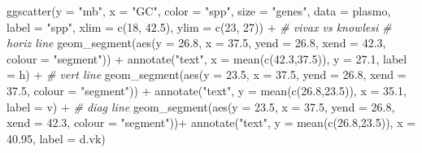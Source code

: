 \documentclass[
]{book}
\newenvironment{Shaded}{\begin{snugshade}}{\end{snugshade}}
\newcommand{\AttributeTok}[1]{\textcolor[rgb]{0.77,0.63,0.00}{#1}}
\newcommand{\CommentTok}[1]{\textcolor[rgb]{0.56,0.35,0.01}{\textit{#1}}}
\newcommand{\DecValTok}[1]{\textcolor[rgb]{0.00,0.00,0.81}{#1}}
\newcommand{\FloatTok}[1]{\textcolor[rgb]{0.00,0.00,0.81}{#1}}
\newcommand{\FunctionTok}[1]{\textcolor[rgb]{0.00,0.00,0.00}{#1}}
\newcommand{\NormalTok}[1]{#1}
\newcommand{\SpecialCharTok}[1]{\textcolor[rgb]{0.00,0.00,0.00}{#1}}
\newcommand{\StringTok}[1]{\textcolor[rgb]{0.31,0.60,0.02}{#1}}
\begin{document}
\begin{Shaded}
\begin{Highlighting}[]
\FunctionTok{ggscatter}\NormalTok{(}\AttributeTok{y =} \StringTok{"mb"}\NormalTok{,}
          \AttributeTok{x =} \StringTok{"GC"}\NormalTok{,}
          \AttributeTok{color =} \StringTok{"spp"}\NormalTok{,}
          \AttributeTok{size =} \StringTok{"genes"}\NormalTok{,}
          \AttributeTok{data =}\NormalTok{ plasmo,}
          \AttributeTok{label =} \StringTok{"spp"}\NormalTok{,}
          \AttributeTok{xlim =} \FunctionTok{c}\NormalTok{(}\DecValTok{18}\NormalTok{, }\FloatTok{42.5}\NormalTok{),}
          \AttributeTok{ylim =} \FunctionTok{c}\NormalTok{(}\DecValTok{23}\NormalTok{, }\DecValTok{27}\NormalTok{)) }\SpecialCharTok{+}
    \CommentTok{\# vivax vs knowlesi}
   \CommentTok{\# horiz line}
   \FunctionTok{geom\_segment}\NormalTok{(}\FunctionTok{aes}\NormalTok{(}\AttributeTok{y    =} \FloatTok{26.8}\NormalTok{,    }\AttributeTok{x =} \FloatTok{37.5}\NormalTok{,}
                   \AttributeTok{yend =} \FloatTok{26.8}\NormalTok{, }\AttributeTok{xend =} \FloatTok{42.3}\NormalTok{,}
                   \AttributeTok{colour =} \StringTok{"segment"}\NormalTok{)) }\SpecialCharTok{+}
  \FunctionTok{annotate}\NormalTok{(}\StringTok{"text"}\NormalTok{,}
           \AttributeTok{x =} \FunctionTok{mean}\NormalTok{(}\FunctionTok{c}\NormalTok{(}\FloatTok{42.3}\NormalTok{,}\FloatTok{37.5}\NormalTok{)), }
           \AttributeTok{y =} \FloatTok{27.1}\NormalTok{,}
           \AttributeTok{label =}\NormalTok{ h) }\SpecialCharTok{+}
  \CommentTok{\# vert line}
   \FunctionTok{geom\_segment}\NormalTok{(}\FunctionTok{aes}\NormalTok{(}\AttributeTok{y    =} \FloatTok{23.5}\NormalTok{,    }\AttributeTok{x =} \FloatTok{37.5}\NormalTok{,}
                   \AttributeTok{yend =} \FloatTok{26.8}\NormalTok{, }\AttributeTok{xend =} \FloatTok{37.5}\NormalTok{,}
                   \AttributeTok{colour =} \StringTok{"segment"}\NormalTok{)) }\SpecialCharTok{+}
    \FunctionTok{annotate}\NormalTok{(}\StringTok{"text"}\NormalTok{,}
           \AttributeTok{y =} \FunctionTok{mean}\NormalTok{(}\FunctionTok{c}\NormalTok{(}\FloatTok{26.8}\NormalTok{,}\FloatTok{23.5}\NormalTok{)), }
           \AttributeTok{x =} \FloatTok{35.1}\NormalTok{,}
           \AttributeTok{label =}\NormalTok{ v) }\SpecialCharTok{+}
    \CommentTok{\# diag line}
  \FunctionTok{geom\_segment}\NormalTok{(}\FunctionTok{aes}\NormalTok{(}\AttributeTok{y    =} \FloatTok{23.5}\NormalTok{,    }\AttributeTok{x =} \FloatTok{37.5}\NormalTok{, }
                   \AttributeTok{yend =} \FloatTok{26.8}\NormalTok{, }\AttributeTok{xend =} \FloatTok{42.3}\NormalTok{, }
                   \AttributeTok{colour =} \StringTok{"segment"}\NormalTok{))}\SpecialCharTok{+}
    \FunctionTok{annotate}\NormalTok{(}\StringTok{"text"}\NormalTok{,}
           \AttributeTok{y =} \FunctionTok{mean}\NormalTok{(}\FunctionTok{c}\NormalTok{(}\FloatTok{26.8}\NormalTok{,}\FloatTok{23.5}\NormalTok{)), }
           \AttributeTok{x =} \FloatTok{40.95}\NormalTok{,}
           \AttributeTok{label =}\NormalTok{ d.vk) }
\end{Highlighting}
\end{Shaded}
\end{document}
